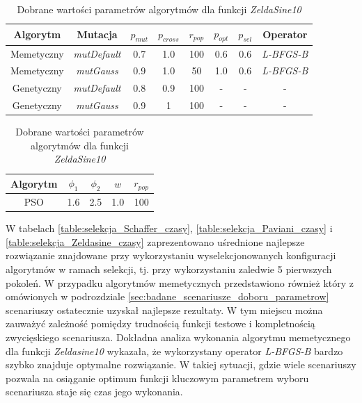 \begin{table}[ht]
\caption{Dobrane wartości parametrów algorytmów dla funkcji \emph{ZeldaSine10}}
\label{table:selekcja_Zeldasine_parametry}
\begin{center}
\begin{tabular}{|c|c|c|c|c|c|c|c|}
	\hline
	Algorytm & Mutacja & $p_{mut}$ & $p_{cross}$ & $r_{pop}$ & $p_{opt}$ & $p_{sel}$ & Operator\\
	\hline
	Memetyczny & \emph{mutDefault} & 0.7 & 1.0 & 100 & 0.6 & 0.6 & \emph{L-BFGS-B} \\
	Memetyczny & \emph{mutGauss}  & 0.9 & 1.0 & 50 & 1.0 & 0.6 & \emph{L-BFGS-B} \\
	Genetyczny & \emph{mutDefault} & 0.8 & 0.9 & 100 & - & - & - \\
	Genetyczny & \emph{mutGauss}  & 0.9 & 1 & 100 & - & - & - \\
	\hline
	\end{tabular}

\begin{tabular}{|c|c|c|c|c|}
	\hline
	Algorytm & $\phi_1$ & $\phi_2$ & $w$ & $r_{pop}$ \\
	\hline
	PSO & 1.6 & 2.5 & 1.0 & 100 \\
	\hline
\end{tabular}
\end{center}
\end{table}

\par
W tabelach \ref{table:selekcja_Schaffer_czasy}, \ref{table:selekcja_Paviani_czasy} i \ref{table:selekcja_Zeldasine_czasy} zaprezentowano uśrednione najlepsze rozwiązanie znajdowane przy wykorzystaniu wyselekcjonowanych konfiguracji algorytmów w ramach selekcji, tj. przy wykorzystaniu zaledwie 5 pierwszych pokoleń. W przypadku algorytmów memetycznych przedstawiono również który z omówionych w podrozdziale \ref{sec:badane_scenariusze_doboru_parametrow} scenariuszy ostatecznie uzyskał najlepsze rezultaty. W  tym miejscu można zauważyć zależność pomiędzy trudnością funkcji testowe i kompletnością zwycięskiego scenariusza. Dokładna analiza wykonania algorytmu memetycznego dla funkcji \emph{Zeldasine10} wykazała, że wykorzystany operator \emph{L-BFGS-B} bardzo szybko znajduje optymalne rozwiązanie. W takiej sytuacji, gdzie wiele scenariuszy pozwala na osiąganie optimum funkcji kluczowym parametrem wyboru scenariusza staje się czas jego wykonania. 

